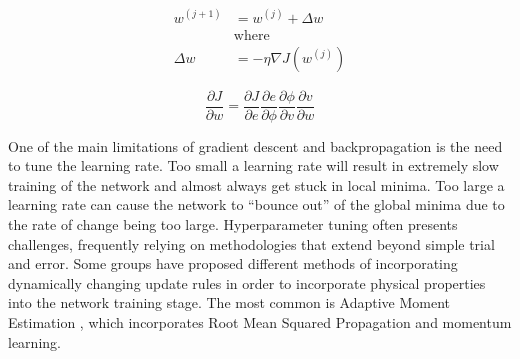 \begin{equation}
    \begin{aligned}
        w^{(j+1)} &= w^{(j)} + \Delta w\\
        &\text{where} \\
        \Delta w &= -\eta \nabla J(w^{(j)})
    \end{aligned}
    \label{eq:grad-descent}
\end{equation}

\begin{equation}
    \frac{\partial J}{\partial w} = \frac{\partial J}{\partial e}\frac{\partial e}{\partial \phi}\frac{\partial \phi}{\partial v} \frac{\partial v}{\partial w}
    \label{eq:chain-rule}
\end{equation}

One of the main limitations of gradient descent and backpropagation is the need to tune the learning rate.
Too small a learning rate will result in extremely slow training of the network and almost always get stuck in local minima.
Too large a learning rate can cause the network to ``bounce out'' of the global minima due to the rate of change being too large.
Hyperparameter tuning often presents challenges, frequently relying on methodologies that extend beyond simple trial and error.
Some groups have proposed different methods of incorporating dynamically changing update rules in order to incorporate physical properties into the network training stage.
The most common is Adaptive Moment Estimation \cite{kingmaAdamMethodStochastic2017}, which incorporates Root Mean Squared Propagation \cite{hinton2012neural} and momentum learning.


